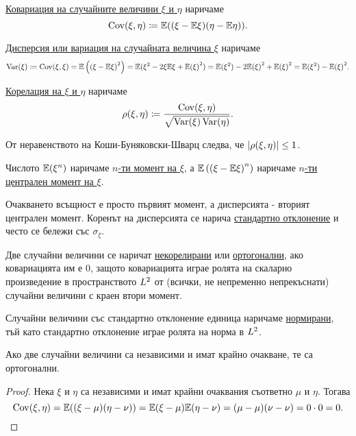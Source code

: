 \documentclass[numbers=endperiod, DIV=15, bibliography=totocnumbered]{scrartcl}
\begin{document}
\begin{definition}
  \uline{Ковариация на случайните величини $\xi$ и $\eta$} наричаме
  \begin{displaymath}
    \operatorname{Cov}(\xi, \eta)
    \coloneqq
    \mathbb{E}((\xi - \mathbb{E} \xi) (\eta - \mathbb{E} \eta)).
  \end{displaymath}

  \uline{Дисперсия или вариация на случайната величина $\xi$} наричаме
  \begin{displaymath}
    \operatorname{Var}(\xi)
    \coloneqq
    \operatorname{Cov}(\xi, \xi)
    =
    \mathbb{E} \left({(\xi - \mathbb{E} \xi)}^2 \right)
    =
    \mathbb{E}(\xi^2 - 2 \xi \mathbb{E} \xi + {\mathbb{E}(\xi)}^2)
    =
    \mathbb{E}(\xi^2) - 2 {\mathbb{E}(\xi)}^2 + {\mathbb{E}(\xi)}^2
    =
    \mathbb{E}(\xi^2) - {\mathbb{E}(\xi)}^2.
  \end{displaymath}

  \uline{Корелация на $\xi$ и $\eta$} наричаме
  \begin{displaymath}
    \operatorname{\rho}(\xi, \eta)
    \coloneqq
    \frac {\operatorname{Cov}(\xi, \eta)} {\sqrt{\operatorname{Var}(\xi) \operatorname{Var}(\eta)}}.
  \end{displaymath}

  От неравенството на Коши-Буняковски-Шварц следва, че $\left\vert \operatorname{\rho}(\xi, \eta) \right\vert \leq 1$.

  Числото $\mathbb{E}(\xi^n)$ наричаме \uline{$n$-ти момент на $\xi$}, а $\mathbb{E} \left( {(\xi - \mathbb{E} \xi)}^n \right)$ наричаме \uline{$n$-ти централен момент на $\xi$}.

  Очакването всъщност е просто първият момент, а дисперсията - вторият централен момент. Коренът на дисперсията се нарича \uline{стандартно отклонение} и често се бележи със $\sigma_\xi$.

  Две случайни величини се наричат \uline{некорелирани} или \uline{ортогонални}, ако ковариацията им е $0$, защото ковариацията играе ролята на скаларно произведение в пространството $L^2$ от (всички, не непременно непрекъснати) случайни величини с краен втори момент.

  Случайни величини със стандартно отклонение единица наричаме \uline{нормирани}, тъй като стандартно отклонение играе ролята на норма в $L^2$.
\end{definition}

\begin{proposition}\label{thm:orthogonal-if-independent}
  Ако две случайни величини са независими и имат крайно очакване, те са ортогонални.
\end{proposition}
\begin{proof}
  Нека $\xi$ и $\eta$ са независими и имат крайни очаквания съответно $\mu$ и $\eta$. Тогава
  \begin{displaymath}
    \operatorname{Cov}(\xi, \eta)
    =
    \mathbb{E}((\xi - \mu) (\eta - \nu))
    =
    \mathbb{E}(\xi - \mu) \mathbb{E}(\eta - \nu)
    =
    (\mu - \mu) (\nu - \nu)
    =
    0 \cdot 0
    =
    0.
  \end{displaymath}
\end{proof}
\end{document}

